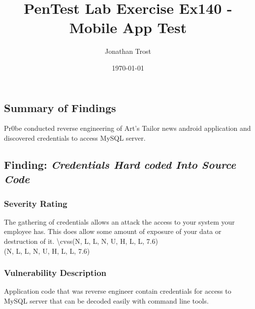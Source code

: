 \documentclass[notitlepage]{article}
\begin{document}
	
	
	\title{PenTest Lab Exercise Ex140 - Mobile App Test}
	\author{Jonathan Trost}
	\date{\isodate\today}
	
	\maketitle
	
	\tableofcontents
	
	\newpage
	
	\subsection{Summary of Findings}
	\indent Pr0be conducted reverse engineering of Art's Tailor news android application and discovered credentials to access MySQL server.  
	
	\subsection{Finding: \emph{Credentials Hard coded Into Source Code}}
	
	\subsubsection{Severity Rating}
	\indent The gathering of credentials allows an attack the access to your system your employee has. This does allow some amount of exposure of your data or destruction of it. 
	\textbackslash cvss(N, L, L, N, U, H, L, L, 7.6)\\
	\cvss(N, L, L, N, U, H, L, L, 7.6) \\
	
	\subsubsection{Vulnerability Description}
	\indent Application code that was reverse engineer contain credentials for access to MySQL server that can be decoded easily with command line tools. \\
	
\end{document}
